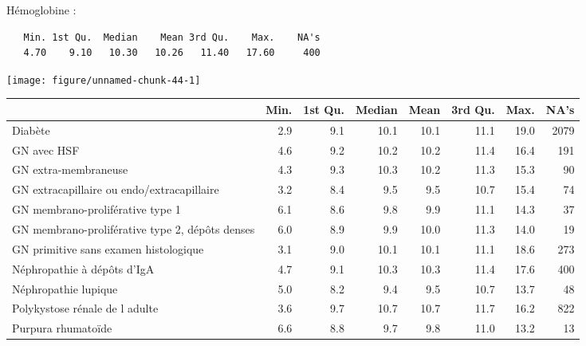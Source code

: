 \documentclass[11pt,a4paper]{article}\usepackage[]{graphicx}\usepackage[]{color}
\makeatletter
\def\maxwidth{ %
  \ifdim\Gin@nat@width>\linewidth
    \linewidth
  \else
    \Gin@nat@width
  \fi
}
\newenvironment{kframe}{%
 \def\at@end@of@kframe{}%
 \ifinner\ifhmode%
  \def\at@end@of@kframe{\end{minipage}}%
  \begin{minipage}{\columnwidth}%
 \fi\fi%
 \def\FrameCommand##1{\hskip\@totalleftmargin \hskip-\fboxsep
 \colorbox{shadecolor}{##1}\hskip-\fboxsep
     \hskip-\linewidth \hskip-\@totalleftmargin \hskip\columnwidth}%
 \MakeFramed {\advance\hsize-\width
   \@totalleftmargin\z@ \linewidth\hsize
   \@setminipage}}%
 {\par\unskip\endMakeFramed%
 \at@end@of@kframe}
\newenvironment{knitrout}{}{} %
\makeatother
\begin{document}
Hémoglobine :

\begin{knitrout}
\color{fgcolor}\begin{kframe}
\begin{verbatim}
   Min. 1st Qu.  Median    Mean 3rd Qu.    Max.    NA's 
   4.70    9.10   10.30   10.26   11.40   17.60     400 
\end{verbatim}
\end{kframe}
\texttt{[image: figure/unnamed-chunk-44-1]} 

\end{knitrout}

\begin{table}[ht]
\centering
\begin{tabular}{lrrrrrrr}
  \hline
 & Min. & 1st Qu. & Median & Mean & 3rd Qu. & Max. & NA's \\ 
  \hline
Diabète & 2.9 & 9.1 & 10.1 & 10.1 & 11.1 & 19.0 & 2079 \\ 
  GN avec HSF & 4.6 & 9.2 & 10.2 & 10.2 & 11.4 & 16.4 & 191 \\ 
  GN extra-membraneuse & 4.3 & 9.3 & 10.3 & 10.2 & 11.3 & 15.3 & 90 \\ 
  GN extracapillaire ou endo/extracapillaire & 3.2 & 8.4 & 9.5 & 9.5 & 10.7 & 15.4 & 74 \\ 
  GN membrano-proliférative type 1 & 6.1 & 8.6 & 9.8 & 9.9 & 11.1 & 14.3 & 37 \\ 
  GN membrano-proliférative type 2, dépôts denses & 6.0 & 8.9 & 9.9 & 10.0 & 11.3 & 14.0 & 19 \\ 
  GN primitive sans examen histologique & 3.1 & 9.0 & 10.1 & 10.1 & 11.1 & 18.6 & 273 \\ 
  Néphropathie à dépôts d'IgA & 4.7 & 9.1 & 10.3 & 10.3 & 11.4 & 17.6 & 400 \\ 
  Néphropathie lupique & 5.0 & 8.2 & 9.4 & 9.5 & 10.7 & 13.7 & 48 \\ 
  Polykystose rénale de l adulte & 3.6 & 9.7 & 10.7 & 10.7 & 11.7 & 16.2 & 822 \\ 
  Purpura rhumatoïde & 6.6 & 8.8 & 9.7 & 9.8 & 11.0 & 13.2 & 13 \\ 
   \hline
\end{tabular}
\end{table}
\end{document}
